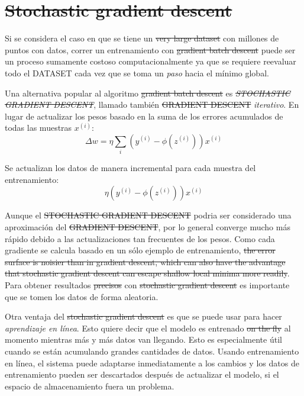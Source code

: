 \section{\sout{Stochastic gradient descent}}
Si se considera el caso en que se tiene un \sout{very large dataset} con millones
de puntos con datos, correr un entrenamiento con \sout{gradient batch descent} puede ser
un proceso sumamente costoso computacionalmente ya que se requiere reevaluar
todo el DATASET cada vez que se toma un \textit{paso} hacia el mínimo global.

Una alternativa popular al algoritmo \sout{gradient batch descent} es \textit{\sout{STOCHASTIC
  GRADIENT DESCENT}}, llamado también \sout{GRADIENT DESCENT} \textit{iterativo}. En lugar
de actualizar los pesos basado en la suma de los errores acumulados de todas las
muestras $x^{(i)}$:
\begin{equation}
  \Delta w = \eta \sum_i(y^{(i)} - \phi(z^{(i)}))x^{(i)}
\end{equation}

Se actualizan los datos de manera incremental para cada muestra del entrenamiento:
\begin{equation}
  \eta(y^{(i)} - \phi(z^{(i)}))x^{(i)}
\end{equation}

Aunque el \sout{STOCHASTIC GRADIENT DESCENT} podria ser considerado una aproximación
del \sout{GRADIENT DESCENT}, por lo general converge mucho más rápido debido a las
actualizaciones tan frecuentes de los pesos. Como cada gradiente se calcula
basado en un sólo ejemplo de entrenamiento, \sout{the error surface is noisier than in gradient descent, which can also have
the advantage that stochastic gradient descent can escape shallow local minima more
readily}. Para obtener resultados \sout{precisos} con \sout{stochastic gradient descent}
es importante que se tomen los datos de forma aleatoria.

Otra ventaja del \sout{stochastic gradient descent} es que se puede usar para
hacer \textit{aprendizaje en línea}. Esto quiere decir que el modelo es entrenado
\sout{on the fly} al momento mientras más y más datos van llegando. Esto es
especialmente útil cuando se están acumulando grandes cantidades de datos.
Usando entrenamiento en línea, el sistema puede adaptarse inmediatamente a
los cambios y los datos de entrenamiento pueden ser descartados después de
actualizar el modelo, si el espacio de almacenamiento fuera un problema.

